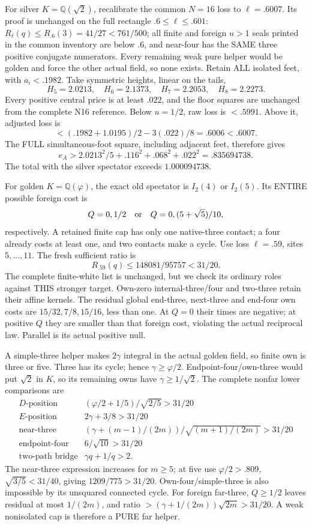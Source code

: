 \documentclass[11pt]{article}
\begin{document}
For silver \(K=\mathbb Q(\sqrt2)\),
recalibrate the common \(N=16\) loss to
\(\ell=.6007\).
Its proof is unchanged on the full rectangle
\(.6\le\ell\le.601\):
\(R_\ell(q)\le R_{.6}(3)=41/27<761/500\);
all finite and foreign \(u>1\) seals
printed in the common inventory are below
\(.6\), and near-four has the SAME three
positive conjugate numerators.
Every remaining weak pure helper would
be golden and force the other actual field,
so none exists.
Retain ALL isolated feet, with
\(a_i<.1982\).
Take symmetric heights, linear on the tails,
\[
             H_5=2.0213,\quad H_6=2.1373,\quad
             H_7=2.2053,\quad H_8=2.2273 .
\]
Every positive central price is at least
\(.022\), and the floor squares are unchanged
from the complete N16 reference.
Below \(u=1/2\), raw loss is \(<.5991\).
Above it, adjusted loss is
\[
             <(.1982+1.0195)/2-3(.022)/8
                          =.6006<.6007 .
\]
The FULL simultaneous-foot square, including
adjacent feet, therefore gives
\[
                 e_A>2.0213^2/5+.116^2+.068^2+.022^2
                       =.835694738 .
\]
The total with the silver spectator
exceeds \(1.000094738\).

For golden \(K=\mathbb Q(\varphi)\),
the exact old spectator is \(I_2(4)\)
or \(I_2(5)\).
Its ENTIRE possible foreign cost is
\[
 Q=0,1/2\quad\hbox{or}\quad Q=0,(5+\sqrt5)/10,
\]
respectively.
A retained finite cap has only one
native-three contact; a four already costs
at least one, and two contacts make a cycle.
Use loss \(\ell=.59\), sites \(5,\ldots,11\).
The fresh sufficient ratio is
\[
                  R_{.59}(q)\le148081/95757<31/20 .
\]
The complete finite-white list is unchanged,
but we check its ordinary roles against
THIS stronger target.
Own-zero internal-three/four and two-three
retain their affine kernels.
The residual global end-three, next-three
and end-four own costs are \(15/32,7/8,15/16\),
less than one.
At \(Q=0\) their times are negative;
at positive \(Q\) they are smaller than
that foreign cost, violating the actual
reciprocal law.
Parallel is its actual positive null.

A simple-three helper makes \(2\gamma\)
integral in the actual golden field,
so finite own is three or five.
Three has its cycle; hence
\(\gamma\ge\varphi/2\).
Endpoint-four/own-three would put
\(\sqrt2\) in \(K\), so its remaining
owns have \(\gamma\ge1/\sqrt2\).
The complete nonfar lower comparisons are
\[
 \begin{array}{c|c}
 D\text{-position}&(\varphi/2+1/5)/\sqrt{2/5}>31/20\\
 E\text{-position}&2\gamma+3/8>31/20\\
 \text{near-three}&
 (\gamma+(m-1)/(2m))/\sqrt{(m+1)/(2m)}>31/20\\
 \text{endpoint-four}&6/\sqrt{10}>31/20\\
 \text{two-path bridge}&\gamma q+1/q>2 .
 \end{array}
\]
The near-three expression increases for
\(m\ge5\); at five use \(\varphi/2>.809\),
\(\sqrt{3/5}<31/40\), giving
\(1209/775>31/20\).
Own-four/simple-three is also impossible
by its unsquared connected cycle.
For foreign far-three, \(Q\ge1/2\)
leaves residual at most \(1/(2m)\),
and ratio \(>(\gamma+1/(2m))\sqrt{2m}>31/20\).
A weak nonisolated cap is therefore
a PURE far helper.
\end{document}
